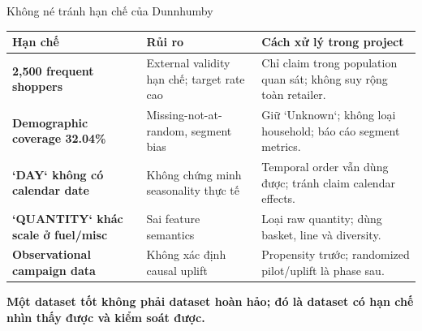 \documentclass[aspectratio=169,11pt]{beamer}
\begin{document}
\begin{frame}{Không né tránh hạn chế của Dunnhumby}
  \small
  \begin{tabularx}{\textwidth}{>{\bfseries}p{3.4cm}X>{\RaggedRight\arraybackslash}p{4.6cm}}
    \toprule
    Hạn chế & Rủi ro & Cách xử lý trong project \\
    \midrule
    2,500 frequent shoppers & External validity hạn chế; target rate cao &
      Chỉ claim trong population quan sát; không suy rộng toàn retailer. \\
    Demographic coverage 32.04\% & Missing-not-at-random, segment bias &
      Giữ `Unknown`; không loại household; báo cáo segment metrics. \\
    `DAY` không có calendar date & Không chứng minh seasonality thực tế &
      Temporal order vẫn dùng được; tránh claim calendar effects. \\
    `QUANTITY` khác scale ở fuel/misc & Sai feature semantics &
      Loại raw quantity; dùng basket, line và diversity. \\
    Observational campaign data & Không xác định causal uplift &
      Propensity trước; randomized pilot/uplift là phase sau. \\
    \bottomrule
  \end{tabularx}
  \vspace{0.2cm}
  \begin{center}
    \textbf{Một dataset tốt không phải dataset hoàn hảo; đó là dataset có hạn chế
    nhìn thấy được và kiểm soát được.}
  \end{center}
\end{frame}
\end{document}
